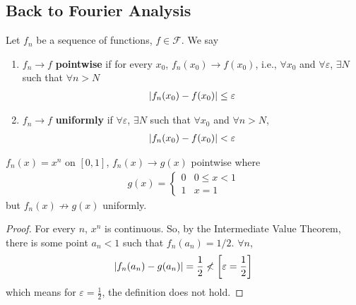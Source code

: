 \subsection{Back to Fourier Analysis}
\begin{definition}
    Let $f_n$ be a sequence of functions, $f \in \mathcal{F}$. We say
    \begin{enumerate}
        \item $f_n \to f$ \textbf{pointwise} if for every $x_0$, $f_n(x_0) \to f(x_0)$, i.e., $\forall x_0$ and $\forall \varepsilon$, $\exists N$ such that $\forall n > N$
        \begin{align}
            \abs{
                f_n(x_0) - f(x_0)} \le \varepsilon
        \end{align}
        \item $f_n \to f$ \textbf{uniformly} if $\forall \varepsilon$, $\exists N$ such that $\forall x_0$ and $\forall n > N$,
        \begin{align}
            \abs{f_n(x_0) - f(x_0)} < \varepsilon
        \end{align}
    \end{enumerate}
\end{definition}
\begin{lemma}
    $f_n(x) = x^n$ on $[0,1]$, $f_n(x) \to g(x)$ pointwise where
    \begin{align}
        g(x) = \begin{cases}
            0&0 \le x < 1\\
            1&x=1
        \end{cases}
    \end{align}
    but $f_n(x) \not\to g(x)$ uniformly.
\end{lemma}
\begin{proof}
    For every $n$, $x^n$ is continuous. So, by the Intermediate Value Theorem, there is some point $a_n < 1$ such that $f_n(a_n) = 1/2$. $\forall n$,
    \begin{align}
        \abs{f_n(a_n) - g(a_n)} = \frac{1}{2} \not< \left[ \varepsilon = \frac{1}{2} \right]
    \end{align}
    which means for $\varepsilon = \frac{1}{2}$, the definition does not hold.
\end{proof}
